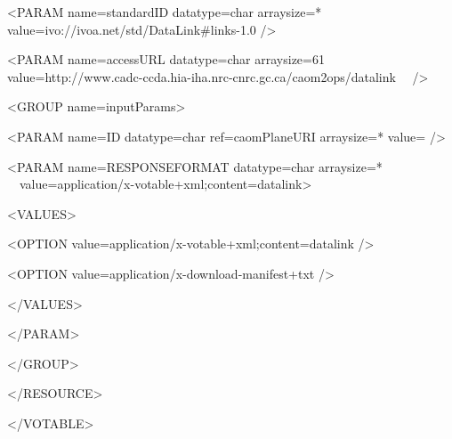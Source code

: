 \documentclass[11pt,a4paper]{ivoa}
\begin{document}
 {\textless}PARAM name={\textquotedbl}standardID{\textquotedbl} datatype={\textquotedbl}char{\textquotedbl}
arraysize={\textquotedbl}*{\textquotedbl} value={\textquotedbl}ivo://ivoa.net/std/DataLink\#links-1.0{\textquotedbl}
/{\textgreater}

 {\textless}PARAM name={\textquotedbl}accessURL{\textquotedbl} datatype={\textquotedbl}char{\textquotedbl}
arraysize={\textquotedbl}61{\textquotedbl}
value={\textquotedbl}http://www.cadc-ccda.hia-iha.nrc-cnrc.gc.ca/caom2ops/datalink{\textquotedbl} \ \ /{\textgreater}

 {\textless}GROUP name={\textquotedbl}inputParams{\textquotedbl}{\textgreater}

 {\textless}PARAM name={\textquotedbl}ID{\textquotedbl} datatype={\textquotedbl}char{\textquotedbl}
ref={\textquotedbl}caomPlaneURI{\textquotedbl} arraysize={\textquotedbl}*{\textquotedbl}
value={\textquotedbl}{\textquotedbl} /{\textgreater}

 {\textless}PARAM name={\textquotedbl}RESPONSEFORMAT{\textquotedbl} datatype={\textquotedbl}char{\textquotedbl}
arraysize={\textquotedbl}*{\textquotedbl}
\ \ value={\textquotedbl}application/x-votable+xml;content=datalink{\textquotedbl}{\textgreater}

  {\textless}VALUES{\textgreater}

 {\textless}OPTION value={\textquotedbl}application/x-votable+xml;content=datalink{\textquotedbl} /{\textgreater}

 {\textless}OPTION value={\textquotedbl}application/x-download-manifest+txt{\textquotedbl} /{\textgreater}

 {\textless}/VALUES{\textgreater}

 {\textless}/PARAM{\textgreater}

 {\textless}/GROUP{\textgreater}

{\textless}/RESOURCE{\textgreater}

{\textless}/VOTABLE{\textgreater}
\end{document}
